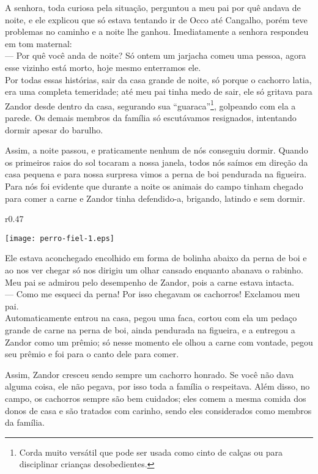 A senhora, toda curiosa pela situação, perguntou a meu pai por quê andava de noite, e ele explicou que só estava tentando ir de Occo até Cangalho, porém teve problemas no caminho e a noite lhe ganhou. Imediatamente a senhora respondeu em tom maternal:\\\indent 
--- Por quê você anda de noite? Só ontem um jarjacha comeu uma pessoa, agora esse vizinho está morto, hoje mesmo enterramos ele.\\\indent
Por todas essas histórias, sair da casa grande de noite, só porque o cachorro latia, era uma completa temeridade; até meu pai tinha medo de sair, ele só gritava para Zandor desde dentro da casa, segurando sua ``guaraca''\footnote{Corda muito versátil que pode ser usada como cinto de calças ou para disciplinar crianças desobedientes.}, golpeando com ela a parede. 
Os demais membros da família só escutávamos resignados, intentando dormir apesar do barulho.

Assim, a noite passou, e praticamente nenhum de nós conseguiu dormir. Quando os primeiros raios do sol tocaram a nossa janela, todos nós saímos em direção da casa pequena e para nossa surpresa vimos a perna de boi pendurada na figueira. Para nós foi evidente que durante a noite os animais do campo tinham chegado para comer a carne e Zandor tinha defendido-a, brigando, latindo e sem dormir.
\ifdefined\EnableIncludeImages 
\begin{wrapfigure}{r}{0.47\textwidth}
  \begin{center}
  \vspace{-0.5cm}
    \texttt{[image: perro-fiel-1.eps]}
  \end{center}
  \vspace{-0.5cm}
\end{wrapfigure}
\fi
Ele estava aconchegado encolhido em forma de bolinha abaixo da perna de boi e ao nos ver chegar só nos dirigiu um olhar cansado enquanto abanava o rabinho. Meu pai se admirou pelo desempenho de Zandor, pois a carne estava intacta.\\\indent
--- Como me esqueci da perna! Por isso chegavam os cachorros! Exclamou meu pai.\\\indent
Automaticamente entrou na casa, pegou uma faca, cortou com ela um pedaço grande de carne na perna de boi, ainda pendurada na figueira, e a entregou a Zandor como um prêmio; só nesse momento ele olhou a carne com vontade, pegou seu prêmio e foi para o canto dele para comer.

Assim, Zandor cresceu sendo sempre um cachorro honrado. Se você não dava alguma coisa, ele não pegava, por isso toda a família o respeitava. Além disso, no campo, os cachorros sempre são bem cuidados; eles comem a mesma comida dos donos de casa e são tratados com carinho, sendo eles considerados como membros da família.

